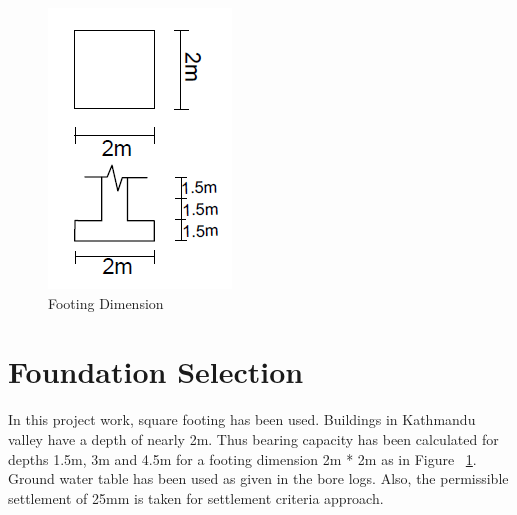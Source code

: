 \begin{figure}
\centering
\includegraphics[width=\linewidth,keepaspectratio]{images/main/footing.png}
\caption{Footing Dimension}
\label{fsec}
\end{figure}
\section{Foundation Selection}
In this project work, square footing has been used. Buildings in Kathmandu valley have a depth of nearly 2m. Thus bearing capacity has been calculated for depths 1.5m, 3m and 4.5m for a footing dimension 2m * 2m as in Figure ~\ref{fsec}. Ground water table has been used as given in the bore logs. Also, the permissible settlement of 25mm is taken for settlement criteria approach.

